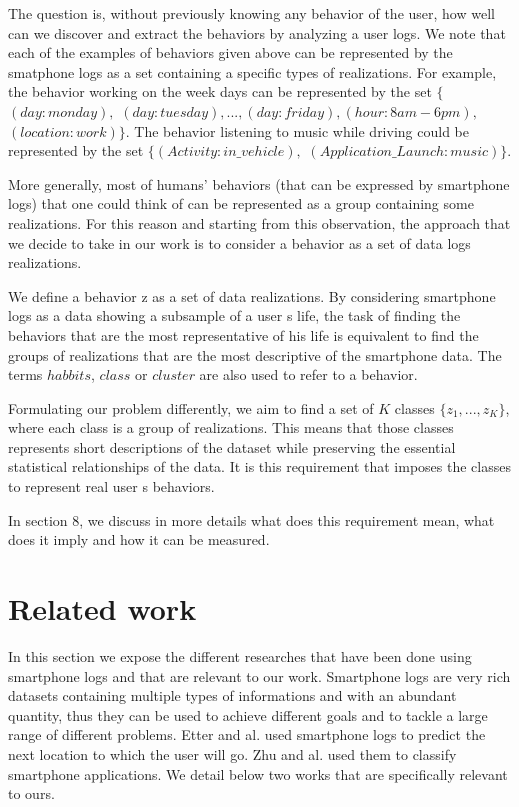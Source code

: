 The question is, without previously knowing any behavior of the user, how well can we discover and extract the behaviors by analyzing a user logs.
We note that each of the examples of behaviors given above can be represented by the smatphone logs as a set containing a specific types of realizations. For example, the behavior working on the week days can be represented by the set $\{$ $(day: monday),$ $(day: tuesday),$$...,$$(day: friday),$$(hour: 8am-6pm),$ $(location: work) \}$.  The behavior listening to music while driving could be represented by the set $\{ (Activity: in\_vehicle),$ $(Application\_ Launch: music)\}$.

More generally, most of humans' behaviors (that can be expressed by smartphone logs) that one could think of can be represented as a group containing some realizations. For this reason and starting from this observation, the approach that we decide to take in our work is to consider a behavior as a set of data logs realizations.

We define a behavior z as a set of data realizations.  By considering smartphone logs as a data showing a subsample of a user s life, the task of finding the behaviors that are the most representative of his life is equivalent to find the groups of realizations that are the most descriptive of the smartphone data. The terms $habbits$, $class$ or $cluster$ are also used to refer to a behavior.

Formulating our problem differently, we aim to find a set of $K$ classes $\{ z_1,...,z_K \} $, where each class is a group of realizations. This means that those classes represents short descriptions of the dataset while preserving the essential statistical relationships of the data. It is this requirement that imposes the classes to represent real user s behaviors.

In section 8, we discuss in more details what does this requirement mean, what does it imply and how it can be measured.



\section{Related work}
In this section we expose the different researches that have been done using smartphone logs and that are relevant to our work. Smartphone logs are very rich datasets containing multiple types of informations and with an abundant quantity, thus they can be used to achieve different goals and to tackle a large range of different problems. Etter and al. \cite{wheretogo} used smartphone logs to predict the next location to which the user will go. Zhu and al. \cite{mobapp} used them to classify smartphone applications. We detail below two works that are specifically relevant to ours.

